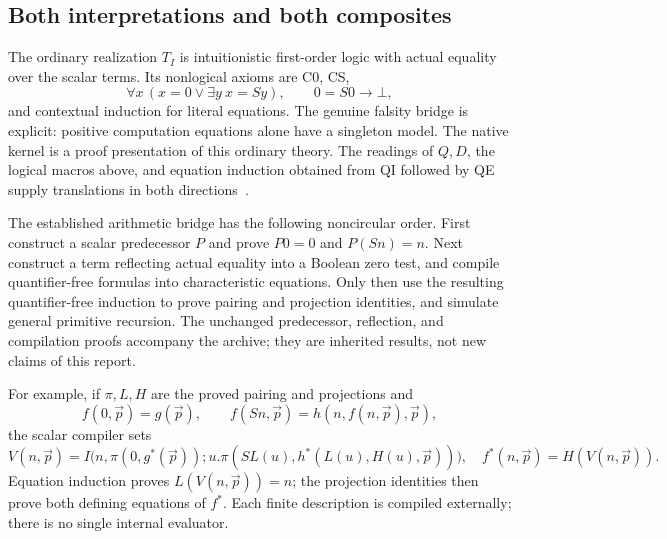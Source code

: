 \documentclass[11pt,letterpaper]{article}
\theoremstyle{definition}
\begin{document}
\subsection{Both interpretations and both composites}
\label{sec:bridge}

The ordinary realization $T_I$ is intuitionistic first-order logic with
actual equality over the scalar terms. Its nonlogical axioms are C0, CS,
\[
\forall x\,(x=0\lor\exists y\ x=Sy),\qquad 0=S0\to\bot,
\]
and contextual induction for literal equations. The genuine falsity bridge
is explicit: positive computation equations alone have a singleton model.
The native kernel is a proof presentation of this ordinary theory. The
readings of $Q,D$, the logical macros above, and equation induction obtained
from QI followed by QE supply translations in both directions~\cite{bridge}.

The established arithmetic bridge has the following noncircular order.
First construct a scalar predecessor $P$ and prove $P0=0$ and $P(Sn)=n$.
Next construct a term reflecting actual equality into a Boolean zero test,
and compile quantifier-free formulas into characteristic equations. Only
then use the resulting quantifier-free induction to prove pairing and
projection identities, and simulate general primitive recursion. The
unchanged predecessor, reflection, and compilation proofs accompany the
archive; they are inherited results, not new claims of this report.

For example, if $\pi,L,H$ are the proved pairing and projections and
\[
f(0,\vec p)=g(\vec p),\qquad
f(Sn,\vec p)=h(n,f(n,\vec p),\vec p),
\]
the scalar compiler sets
\[
V(n,\vec p)=I\bigl(n,\pi(0,g^*(\vec p));
u.\pi(SL(u),h^*(L(u),H(u),\vec p))\bigr),
\quad f^*(n,\vec p)=H(V(n,\vec p)).
\]
Equation induction proves $L(V(n,\vec p))=n$; the projection identities
then prove both defining equations of $f^*$. Each finite description is
compiled externally; there is no single internal evaluator.
\end{document}
